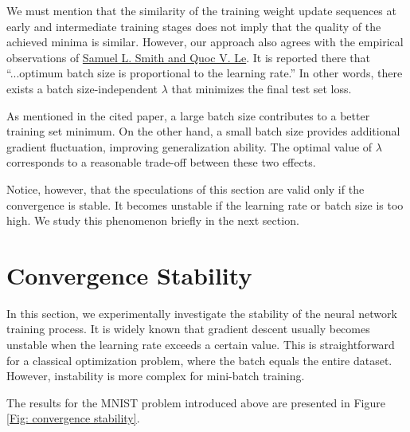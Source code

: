 \documentclass[12pt,a4paper]{amsart}
\numberwithin{equation}{section}
\theoremstyle{remark}
\begin{document}
We must mention that the similarity of the training weight update sequences
at early and intermediate training stages
does not imply that the quality of the achieved minima is similar.
However, our approach also agrees with the empirical observations of
\href{https://arxiv.org/abs/1710.06451}{Samuel L. Smith and Quoc V. Le}.
It is reported there that
``...optimum batch size is proportional to the learning rate.''
In other words, there exists a batch size-independent
$\lambda$
that minimizes the final test set loss.

As mentioned in the cited paper,
a large batch size contributes to a better training set minimum.
On the other hand,
a small batch size provides additional gradient fluctuation,
improving generalization ability.
The optimal value of
$\lambda$
corresponds to a reasonable trade-off between these two effects.

Notice, however, that the speculations of this section are valid only if the convergence is stable.
It becomes unstable if the learning rate or batch size is too high.
We study this phenomenon briefly in the next section.


\section{Convergence Stability \label{Section: convergence stability}}

In this section, we experimentally investigate the stability of the neural network training process.
It is widely known that gradient descent usually becomes unstable when the learning rate exceeds
a certain value.
This is straightforward for a classical optimization problem,
where the batch equals the entire dataset.
However, instability is more complex for mini-batch training.

The results for the MNIST problem introduced above are presented in Figure
\ref{Fig: convergence stability}.
\end{document}
